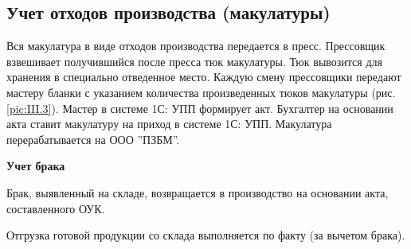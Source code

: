 \newpage
\subsection{Учет отходов производства (макулатуры)}

 

Вся макулатура в виде отходов производства передается в пресс. Прессовщик взвешивает получившийся после пресса тюк макулатуры. Тюк вывозится для хранения в специально отведенное место.  
Каждую смену прессовщики передают мастеру бланки с указанием количества произведенных тюков макулатуры (рис. \ref{pic:III.3}). Мастер в системе 1С: УПП формирует акт.
Бухгалтер на основании акта ставит макулатуру на приход в системе 1С: УПП. Макулатура перерабатывается на ООО ''ПЗБМ''.



\textbf{Учет брака}

Брак, выявленный на складе, возвращается в производство на основании акта, составленного ОУК. 

Отгрузка готовой продукции со склада выполняется по факту (за вычетом брака).








